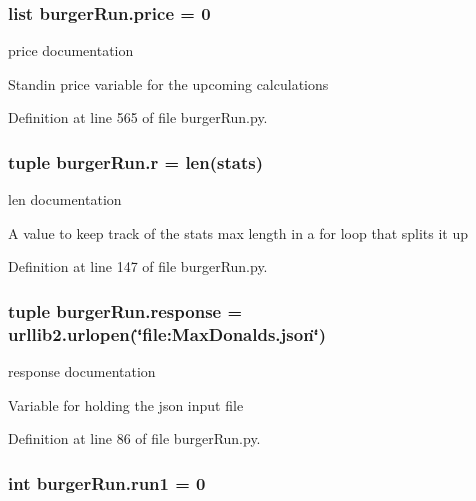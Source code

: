 \hypertarget{namespaceburgerRun_aadf19ccaeaff539b15d838e2431c8cfb}{
\subsubsection[{price}]{\setlength{\rightskip}{0pt plus 5cm}list burger\-Run.\-price = 0}}\label{namespaceburgerRun_aadf19ccaeaff539b15d838e2431c8cfb}


price documentation 

Standin price variable for the upcoming calculations 

Definition at line 565 of file burger\-Run.\-py.

\hypertarget{namespaceburgerRun_a3bcbbcaca046e743572c9ad115a7f79f}{
\subsubsection[{r}]{\setlength{\rightskip}{0pt plus 5cm}tuple burger\-Run.\-r = len({\bf stats})}}\label{namespaceburgerRun_a3bcbbcaca046e743572c9ad115a7f79f}


len documentation 

A value to keep track of the stats max length in a for loop that splits it up 

Definition at line 147 of file burger\-Run.\-py.

\hypertarget{namespaceburgerRun_a7d41aac83d5e0147cd262f5ced74ef35}{
\subsubsection[{response}]{\setlength{\rightskip}{0pt plus 5cm}tuple burger\-Run.\-response = urllib2.\-urlopen(\char`\"{}file\-:\-Max\-Donalds.\-json\char`\"{})}}\label{namespaceburgerRun_a7d41aac83d5e0147cd262f5ced74ef35}


response documentation 

Variable for holding the json input file 

Definition at line 86 of file burger\-Run.\-py.

\hypertarget{namespaceburgerRun_a36244167b95a215e36455252a03bf316}{
\subsubsection[{run1}]{\setlength{\rightskip}{0pt plus 5cm}int burger\-Run.\-run1 = 0}}\label{namespaceburgerRun_a36244167b95a215e36455252a03bf316}


